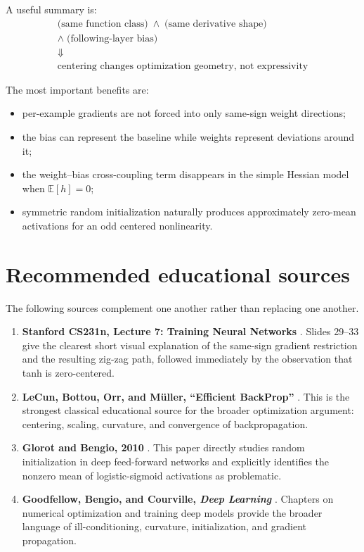 \documentclass[11pt]{article}
\newcommand{\E}{\mathbb{E}}
\begin{document}
A useful summary is:
\begin{equation}
\boxed{
\begin{gathered}
\bigl(\text{same function class}\bigr)
\;\land\;
\bigl(\text{same derivative shape}\bigr)\\[-1pt]
\land\;\bigl(\text{following-layer bias}\bigr)\\[4pt]
\Downarrow\\[-1pt]
\text{centering changes optimization geometry, not expressivity}
\end{gathered}}
\end{equation}

The most important benefits are:
\begin{itemize}
  \item per-example gradients are not forced into only same-sign weight directions;
  \item the bias can represent the baseline while weights represent deviations around it;
  \item the weight--bias cross-coupling term disappears in the simple Hessian model when \(\E[h]=0\);
  \item symmetric random initialization naturally produces approximately zero-mean activations for an odd centered nonlinearity.
\end{itemize}

\section{Recommended educational sources}

The following sources complement one another rather than replacing one another.

\begin{enumerate}
  \item \textbf{Stanford CS231n, Lecture 7: Training Neural Networks} \cite{cs231n2023}.  Slides 29--33 give the clearest short visual explanation of the same-sign gradient restriction and the resulting zig-zag path, followed immediately by the observation that tanh is zero-centered.

  \item \textbf{LeCun, Bottou, Orr, and M\"uller, ``Efficient BackProp''} \cite{lecun1998}.  This is the strongest classical educational source for the broader optimization argument: centering, scaling, curvature, and convergence of backpropagation.

  \item \textbf{Glorot and Bengio, 2010} \cite{glorot2010}.  This paper directly studies random initialization in deep feed-forward networks and explicitly identifies the nonzero mean of logistic-sigmoid activations as problematic.

  \item \textbf{Goodfellow, Bengio, and Courville, \emph{Deep Learning}} \cite{goodfellow2016}.  Chapters on numerical optimization and training deep models provide the broader language of ill-conditioning, curvature, initialization, and gradient propagation.
\end{enumerate}
\end{document}
